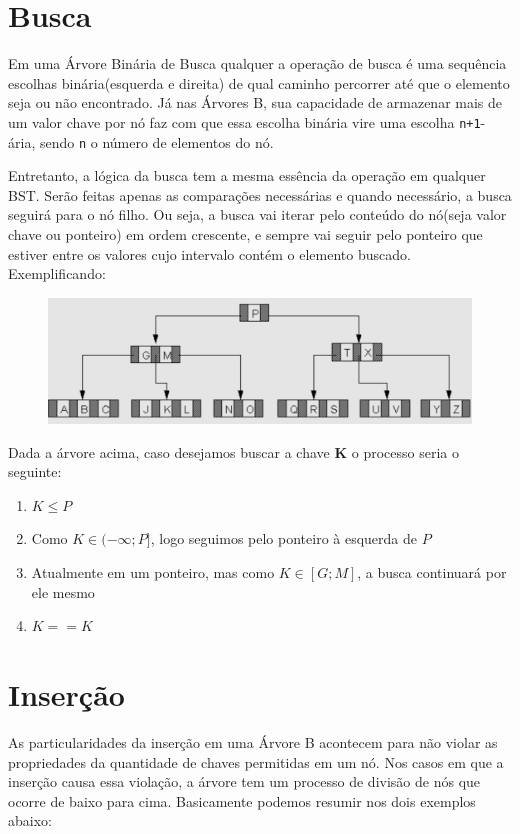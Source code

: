 \section*{Busca}

Em uma Árvore Binária de Busca qualquer a operação de busca é uma sequência escolhas binária(esquerda e direita) de qual caminho percorrer até que o elemento seja ou não encontrado. Já nas Árvores B, sua capacidade de armazenar mais de um valor chave por nó faz com que essa escolha binária vire uma escolha \texttt{n+1}-ária, sendo \texttt{n} o número de elementos do nó.

Entretanto, a lógica da busca tem a mesma essência da operação em qualquer BST. Serão feitas apenas as comparações necessárias e quando necessário, a busca seguirá para o nó filho. Ou seja, a busca vai iterar pelo conteúdo do nó(seja valor chave ou ponteiro) em ordem crescente, e sempre vai seguir pelo ponteiro que estiver entre os valores cujo intervalo contém o elemento buscado. Exemplificando:

\begin{figure}[H]
	\centering
	\includegraphics[scale=0.2]{figures/busca-exemplo.png}
\end{figure}

Dada a árvore acima, caso desejamos buscar a chave \textbf{K} o processo seria o seguinte:

\begin{enumerate}
    \item $K \leq P$
    \item Como $K \in (-\infty; P]$, logo seguimos pelo ponteiro à esquerda de $P$
    \item Atualmente em um ponteiro, mas como $K \in [G; M]$, a busca continuará por ele mesmo
    \item $K == K$
\end{enumerate}

\section*{Inserção}
As particularidades da inserção em uma Árvore B acontecem para não violar as propriedades da quantidade de chaves permitidas em um nó. Nos casos em que a inserção causa essa violação, a árvore tem um processo de divisão de nós que ocorre de baixo para cima. Basicamente podemos resumir nos dois exemplos abaixo:

